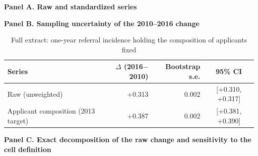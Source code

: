 \begin{table}[htbp]\centering
\caption{Full extract: one-year referral incidence holding the composition of applicants fixed}
\label{tab:P3series}
\label{tab:P3boot}
\label{tab:P3decomp}
\footnotesize
\par\medskip\textbf{Panel A. Raw and standardized series}\par\smallskip
{}
\par\medskip\textbf{Panel B. Sampling uncertainty of the 2010--2016 change}\par\smallskip
\begin{tabular}{lrrc}
\toprule
Series & $\Delta$ (2016$-$2010) & Bootstrap s.e. & 95\% CI \\
\midrule
Raw (unweighted) & +0.313 & 0.002 & [+0.310, +0.317] \\
Applicant composition (2013 target) & +0.387 & 0.002 & [+0.381, +0.390] \\
\bottomrule
\end{tabular}
\par\medskip\textbf{Panel C. Exact decomposition of the raw change and sensitivity to the cell definition}\par\smallskip
{}
\end{table}

